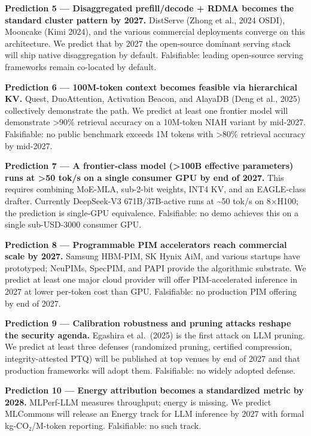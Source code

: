 \textbf{Prediction 5 --- Disaggregated prefill/decode + RDMA becomes the standard cluster pattern by 2027.} DistServe (Zhong et al., 2024 OSDI), Mooncake (Kimi 2024), and the various commercial deployments converge on this architecture. We predict that by 2027 the open-source dominant serving stack will ship native disaggregation by default. Falsifiable: leading open-source serving frameworks remain co-located by default.

\textbf{Prediction 6 --- 100M-token context becomes feasible via hierarchical KV.} Quest, DuoAttention, Activation Beacon, and AlayaDB (Deng et al., 2025) collectively demonstrate the path. We predict at least one frontier model will demonstrate \textgreater90\% retrieval accuracy on a 10M-token NIAH variant by mid-2027. Falsifiable: no public benchmark exceeds 1M tokens with \textgreater80\% retrieval accuracy by mid-2027.

\textbf{Prediction 7 --- A frontier-class model (\textgreater100B effective parameters) runs at \textgreater50 tok/s on a single consumer GPU by end of 2027.} This requires combining MoE-MLA, sub-2-bit weights, INT4 KV, and an EAGLE-class drafter. Currently DeepSeek-V3 671B/37B-active runs at \textasciitilde50 tok/s on 8×H100; the prediction is single-GPU equivalence. Falsifiable: no demo achieves this on a single sub-USD-3000 consumer GPU.

\textbf{Prediction 8 --- Programmable PIM accelerators reach commercial scale by 2027.} Samsung HBM-PIM, SK Hynix AiM, and various startups have prototyped; NeuPIMs, SpecPIM, and PAPI provide the algorithmic substrate. We predict at least one major cloud provider will offer PIM-accelerated inference in 2027 at lower per-token cost than GPU. Falsifiable: no production PIM offering by end of 2027.

\textbf{Prediction 9 --- Calibration robustness and pruning attacks reshape the security agenda.} Egashira et al.~(2025) is the first attack on LLM pruning. We predict at least three defenses (randomized pruning, certified compression, integrity-attested PTQ) will be published at top venues by end of 2027 and that production frameworks will adopt them. Falsifiable: no widely adopted defense.

\textbf{Prediction 10 --- Energy attribution becomes a standardized metric by 2028.} MLPerf-LLM measures throughput; energy is missing. We predict MLCommons will release an Energy track for LLM inference by 2027 with formal kg-CO₂/M-token reporting. Falsifiable: no such track.

